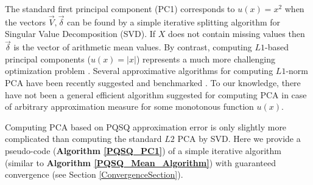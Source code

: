 \documentclass[preprint,12pt,twocolumn]{elsarticle}
\begin{document}
The standard first principal component (PC1) corresponds to $u(x)=x^2$ when the vectors $\vec{V}, \vec{\delta}$ can be found by a simple iterative splitting algorithm for Singular Value Decomposition (SVD). If $X$ does not contain missing values then $\vec{\delta}$ is the vector of arithmetic mean values. By contrast, computing $L1$-based principal components ($u(x)=|x|$) represents a much more challenging optimization problem \cite{Brooks2013}. Several approximative algorithms for computing $L1$-norm PCA have been recently suggested and benchmarked \cite{Ke2005,Kwak2008,Brooks2013,brooks2012pcal1,Park2014}. To our knowledge, there have not been a general efficient algorithm suggested for computing PCA in case of arbitrary approximation measure for some monotonous function $u(x)$.

Computing PCA based on PQSQ approximation error is only slightly more complicated than computing the standard $L2$ PCA by SVD. Here we provide a pseudo-code (\textbf{Algorithm \ref{PQSQ_PC1}}) of a simple iterative algorithm (similar to \textbf{Algorithm \ref{PQSQ_Mean_Algorithm}}) with guaranteed convergence (see Section \ref{ConvergenceSection}).
\end{document}
